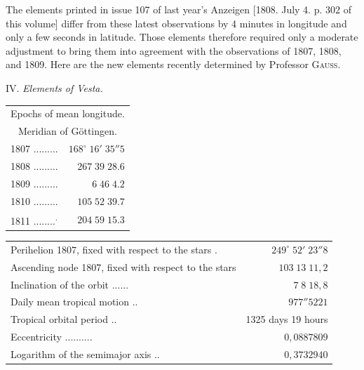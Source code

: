 \par\indent The elements printed in issue 107 of last year’s Anzeigen [1808. July 4. p. 302 of this volume] differ from these latest observations by 4 minutes in longitude and only a few seconds in latitude. Those elements therefore required only a moderate adjustment to bring them into agreement with the observations of 1807, 1808, and 1809. Here are the new elements recently determined by Professor \textsc{Gauss}.



\begin{center}
IV. \emph{Elements of Vesta.}
\end{center}


\begin{center}\fontsize{10}{12}\selectfont\setlength{\tabcolsep}{5pt}\renewcommand{\arraystretch}{1.15}\begin{tabular}{lr}
\multicolumn{2}{c}{Epochs of mean longitude.}\\
\multicolumn{2}{c}{Meridian of Göttingen.}\\
1807 .\;.\;.\;.\;.\;.\;.\;.\;.\; & $168^\circ\;16'\;35''5$\\
1808 .\;.\;.\;.\;.\;.\;.\;.\;.\; & $267\;39\;28.6$\\
1809 .\;.\;.\;.\;.\;.\;.\;.\;.\; & $6\;46\;4.2$\\
1810 .\;.\;.\;.\;.\;.\;.\;.\;.\; & $105\;52\;39.7$\\
1811 .\;.\;.\;.\;.\;.\;.\;.\;\textsuperscript{.}\; & $204\;59\;15.3$\\
\end{tabular}\end{center}

\begin{center}\fontsize{9}{11}\selectfont\setlength{\tabcolsep}{5pt}\renewcommand{\arraystretch}{1.15}\begin{tabular}{lr}

Perihelion 1807, fixed with respect to the stars .\; & $249^\circ\;52'\;23''8$\\
Ascending node 1807, fixed with respect to the stars  & $103\;13\;11{,}2$\\
Inclination of the orbit .\;.\;.\;.\;.\;.\; & $7\;8\;18{,}8$\\
Daily mean tropical motion .\;.\; & $977''5221$\\
Tropical orbital period .\;.\; & 1325 days 19 hours\\
Eccentricity .\;.\;.\;.\;.\;.\;.\;.\;.\;.\; & $0{,}0887809$\\
Logarithm of the semimajor axis .\;.\; & $0{,}3732940$\\
\end{tabular}\end{center}


